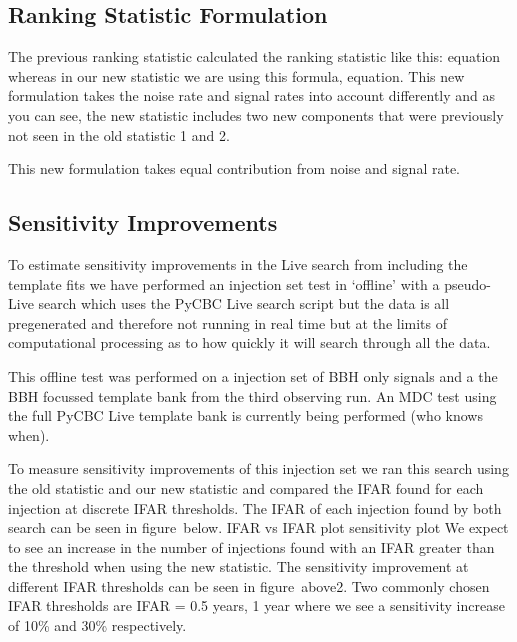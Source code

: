 \subsection{Ranking Statistic Formulation}
The previous ranking statistic calculated the ranking statistic like this:
%
equation
%
whereas in our new statistic we are using this formula,
%
equation.
%
This new formulation takes the noise rate and signal rates into account differently and as you can see, the new statistic includes two new components that were previously not seen in the old statistic
%
1 and 2.
%

This new formulation takes equal contribution from noise and signal rate.

\subsection{Sensitivity Improvements}
To estimate sensitivity improvements in the Live search from including the template fits we have performed an injection set test in `offline' with a pseudo-Live search which uses the PyCBC Live search script but the data is all pregenerated and therefore not running in real time but at the limits of computational processing as to how quickly it will search through all the data.

This offline test was performed on a injection set of BBH only signals and a the BBH focussed template bank from the third observing run. An MDC test using the full PyCBC Live template bank is currently being performed (who knows when).

To measure sensitivity improvements of this injection set we ran this search using the old statistic and our new statistic and compared the IFAR found for each injection at discrete IFAR thresholds. The IFAR of each injection found by both search can be seen in figure~below.
%
IFAR vs IFAR plot
sensitivity plot
%
We expect to see an increase in the number of injections found with an IFAR greater than the threshold when using the new statistic. The sensitivity improvement at different IFAR thresholds can be seen in figure~above2. Two commonly chosen IFAR thresholds are IFAR = 0.5 years, 1 year where we see a sensitivity increase of 10\% and 30\% respectively.

